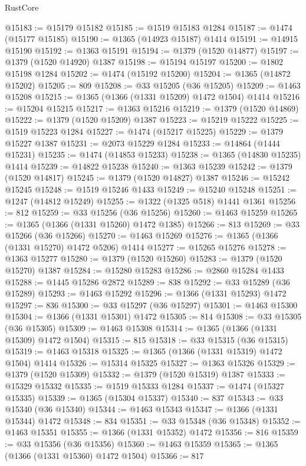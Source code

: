 \begin{lexlean}{RustCore}
\begin{coremodule}
@15183 := @15179 @15182
@15185 := @1519 @15183 @1284
@15187 := @1474 (@15177 @15185)
@15190 := @1365 (@14923 @15187) @1414
@15191 := @14915 @15190
@15192 := @1363 @15191
@15194 := @1379 (@1520 @14877)
@15197 := @1379 (@1520 @14920) @1387
@15198 := @15194 @15197
@15200 := @1802 @15198 @1284
@15202 := @1474 (@15192 @15200)
@15204 := @1365 (@14872 @15202)
@15205 := 809
@15208 := @33 @15205 (@36 @15205)
@15209 := @1463 @15208
@15215 := @1365 (@1366 (@1331 @15209) @1472 @1504) @1414
@15216 := @15204 @15215
@15217 := @1363 @15216
@15219 := @1379 (@1520 @14869)
@15222 := @1379 (@1520 @15209) @1387
@15223 := @15219 @15222
@15225 := @1519 @15223 @1284
@15227 := @1474 (@15217 @15225)
@15229 := @1379 @15227 @1387
@15231 := @2073 @15229 @1284
@15233 := @14864 (@1444 @15231)
@15235 := @1474 (@14853 @15233)
@15238 := @1365 (@14830 @15235) @1414
@15239 := @14822 @15238
@15240 := @1363 @15239
@15242 := @1379 (@1520 @14817)
@15245 := @1379 (@1520 @14827) @1387
@15246 := @15242 @15245
@15248 := @1519 @15246 @1433
@15249 := @15240 @15248
@15251 := @1247 (@14812 @15249)
@15255 := @1322 (@1325 @518) @1441 @1361
@15256 := 812
@15259 := @33 @15256 (@36 @15256)
@15260 := @1463 @15259
@15265 := @1365 (@1366 (@1331 @15260) @1472 @1385)
@15266 := 813
@15269 := @33 @15266 (@36 @15266)
@15270 := @1463 @15269
@15276 := @1365 (@1366 (@1331 @15270) @1472 @5206) @1414
@15277 := @15265 @15276
@15278 := @1363 @15277
@15280 := @1379 (@1520 @15260)
@15283 := @1379 (@1520 @15270) @1387
@15284 := @15280 @15283
@15286 := @2860 @15284 @1433
@15288 := @1445 @15286 @2872
@15289 := 838
@15292 := @33 @15289 (@36 @15289)
@15293 := @1463 @15292
@15296 := @1366 (@1331 @15293) @1472
@15297 := 836
@15300 := @33 @15297 (@36 @15297)
@15301 := @1463 @15300
@15304 := @1366 (@1331 @15301) @1472
@15305 := 814
@15308 := @33 @15305 (@36 @15305)
@15309 := @1463 @15308
@15314 := @1365 (@1366 (@1331 @15309) @1472 @1504)
@15315 := 815
@15318 := @33 @15315 (@36 @15315)
@15319 := @1463 @15318
@15325 := @1365 (@1366 (@1331 @15319) @1472 @1504) @1414
@15326 := @15314 @15325
@15327 := @1363 @15326
@15329 := @1379 (@1520 @15309)
@15332 := @1379 (@1520 @15319) @1387
@15333 := @15329 @15332
@15335 := @1519 @15333 @1284
@15337 := @1474 (@15327 @15335)
@15339 := @1365 (@15304 @15337)
@15340 := 837
@15343 := @33 @15340 (@36 @15340)
@15344 := @1463 @15343
@15347 := @1366 (@1331 @15344) @1472
@15348 := 834
@15351 := @33 @15348 (@36 @15348)
@15352 := @1463 @15351
@15355 := @1366 (@1331 @15352) @1472
@15356 := 816
@15359 := @33 @15356 (@36 @15356)
@15360 := @1463 @15359
@15365 := @1365 (@1366 (@1331 @15360) @1472 @1504)
@15366 := 817

\end{coremodule}
\end{lexlean}
